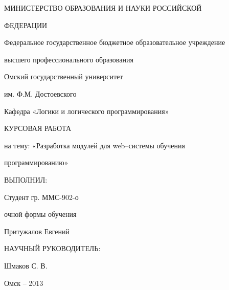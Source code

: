 \thispagestyle{empty}
\large
\begin{center}
МИНИСТЕРСТВО ОБРАЗОВАНИЯ И НАУКИ РОССИЙСКОЙ \par
ФЕДЕРАЦИИ\par 
\vspace{6mm}
Федеральное государственное бюджетное образовательное учреждение\par 
высшего профессионального образования\par 
\vspace{6mm}
Омский государственный университет\par 
им. Ф.М. Достоевского\par 
\vspace{6mm}
Кафедра «Логики и логического программирования»\par 
\vspace{6mm}
КУРСОВАЯ РАБОТА\par
на тему: «Разработка модулей для web–системы обучения\par программированию»\par


\end{center}

\vspace{36mm}
\begin{flushright}

ВЫПОЛНИЛ:\par
Студент гр. ММС-902-о\par
очной формы обучения\par
Притужалов Евгений\par

\vspace{6mm}
НАУЧНЫЙ РУКОВОДИТЕЛЬ: \par
Шмаков С. В.\par


\end{flushright}


\vspace{60mm}
\begin{center}
{Омск -- 2013}
\end{center}

\newpage
